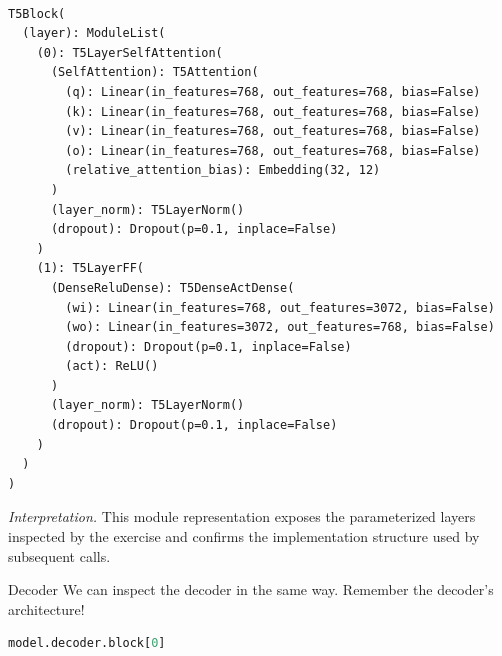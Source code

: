 \documentclass[../labs.tex]{subfiles}
\begin{document}
\begin{lstlisting}[basicstyle=\ttfamily\scriptsize,breaklines=true,breakatwhitespace=false,columns=fullflexible,keepspaces=true]

T5Block(
  (layer): ModuleList(
    (0): T5LayerSelfAttention(
      (SelfAttention): T5Attention(
        (q): Linear(in_features=768, out_features=768, bias=False)
        (k): Linear(in_features=768, out_features=768, bias=False)
        (v): Linear(in_features=768, out_features=768, bias=False)
        (o): Linear(in_features=768, out_features=768, bias=False)
        (relative_attention_bias): Embedding(32, 12)
      )
      (layer_norm): T5LayerNorm()
      (dropout): Dropout(p=0.1, inplace=False)
    )
    (1): T5LayerFF(
      (DenseReluDense): T5DenseActDense(
        (wi): Linear(in_features=768, out_features=3072, bias=False)
        (wo): Linear(in_features=3072, out_features=768, bias=False)
        (dropout): Dropout(p=0.1, inplace=False)
        (act): ReLU()
      )
      (layer_norm): T5LayerNorm()
      (dropout): Dropout(p=0.1, inplace=False)
    )
  )
)

\end{lstlisting}

\noindent\emph{Interpretation.} This module representation exposes the parameterized layers inspected by the exercise and confirms the implementation structure used by subsequent calls.



\noindent Decoder We can inspect the decoder in the same way. Remember the decoder's architecture!

\begin{lstlisting}[language=Python,basicstyle=\ttfamily\scriptsize,breaklines=true,breakatwhitespace=false,columns=fullflexible,keepspaces=true,numbers=none]
model.decoder.block[0]
\end{lstlisting}

\hypertarget{res:lab02-text-01-t5-ipynb-64-cf8c5d45aca1}{}
\end{document}
